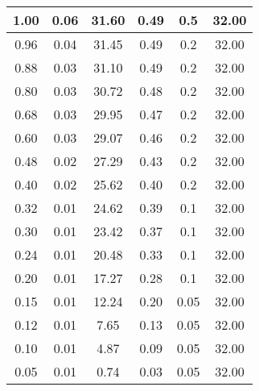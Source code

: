 \documentclass[a4paper, 11pt]{article}
\begin{document}
\begin{longtable}{|c|c|c|c|c|c|}
        \hline
        1.00 & 0.06 & 31.60 & 0.49 & 0.5 & 32.00 \\
        \hline
        0.96 & 0.04 & 31.45 & 0.49 & 0.2 & 32.00 \\
        \hline 
        0.88 & 0.03 & 31.10 & 0.49 & 0.2 & 32.00 \\
        \hline
        0.80 & 0.03 & 30.72 & 0.48 & 0.2 & 32.00 \\
        \hline 
        0.68 & 0.03 & 29.95 & 0.47 & 0.2 & 32.00 \\
        \hline 
        0.60 & 0.03 & 29.07 & 0.46 & 0.2 & 32.00 \\
        \hline 
        0.48 & 0.02 & 27.29 & 0.43 & 0.2 & 32.00 \\
        \hline
        0.40 & 0.02 & 25.62 & 0.40 & 0.2 & 32.00 \\
        \hline 
        0.32 & 0.01 & 24.62 & 0.39 & 0.1 & 32.00 \\
        \hline 
        0.30 & 0.01 & 23.42 & 0.37 & 0.1 & 32.00 \\
        \hline 
        0.24 & 0.01 & 20.48 & 0.33 & 0.1 & 32.00 \\
        \hline 
        0.20 & 0.01 & 17.27 & 0.28 & 0.1 & 32.00 \\
        \hline 
        0.15 & 0.01 & 12.24 & 0.20 & 0.05 & 32.00 \\
        \hline 
        0.12 & 0.01 & 7.65 & 0.13 &	0.05 & 32.00 \\
        \hline 
        0.10 & 0.01 & 4.87 & 0.09 &	0.05 & 32.00 \\
        \hline 
        0.05 & 0.01 & 0.74 & 0.03 &	0.05 & 32.00 \\
\end{longtable}
\end{document}
